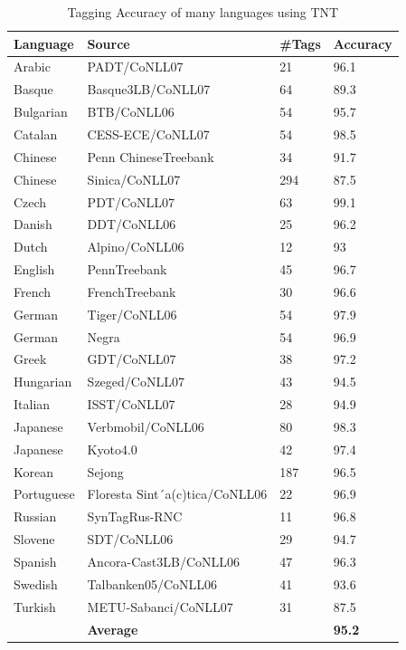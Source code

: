 \begin{table}
  \centering
    \begin{tabular}{llll}
    \textbf{Language} & \textbf{Source} & \textbf{\#Tags}  & \textbf{Accuracy} \\
	\hline
    Arabic & PADT/CoNLL07 & 21    & 96.1 \\
    Basque & Basque3LB/CoNLL07 & 64    & 89.3 \\
    Bulgarian & BTB/CoNLL06 & 54    & 95.7 \\
    Catalan & CESS-ECE/CoNLL07 & 54    & 98.5 \\
    Chinese & Penn ChineseTreebank & 34    & 91.7 \\
    Chinese & Sinica/CoNLL07 & 294   & 87.5 \\
    Czech & PDT/CoNLL07 & 63    & 99.1 \\
    Danish & DDT/CoNLL06 & 25    & 96.2 \\
    Dutch & Alpino/CoNLL06 & 12    & 93 \\
    English & PennTreebank & 45    & 96.7 \\
    French & FrenchTreebank & 30    & 96.6 \\
    German & Tiger/CoNLL06 & 54    & 97.9 \\
    German & Negra & 54    & 96.9 \\
    Greek & GDT/CoNLL07 & 38    & 97.2 \\
    Hungarian & Szeged/CoNLL07 & 43    & 94.5 \\
    Italian & ISST/CoNLL07 & 28    & 94.9 \\
    Japanese & Verbmobil/CoNLL06 & 80    & 98.3 \\
    Japanese & Kyoto4.0 & 42    & 97.4 \\
    Korean & Sejong & 187   & 96.5 \\
    Portuguese & Floresta Sint´a(c)tica/CoNLL06 & 22    & 96.9 \\
    Russian & SynTagRus-RNC & 11    & 96.8 \\
    Slovene & SDT/CoNLL06 & 29    & 94.7 \\
    Spanish & Ancora-Cast3LB/CoNLL06 & 47    & 96.3 \\
    Swedish & Talbanken05/CoNLL06 & 41    & 93.6 \\
    Turkish & METU-Sabanci/CoNLL07 & 31    & 87.5 \\
          & \textbf{Average} &       & \textbf{95.2 }\\
    \end{tabular}%
	 \caption{Tagging Accuracy of many languages using TNT }
  \label{tab:tagAccuracySample}%
\end{table}%
